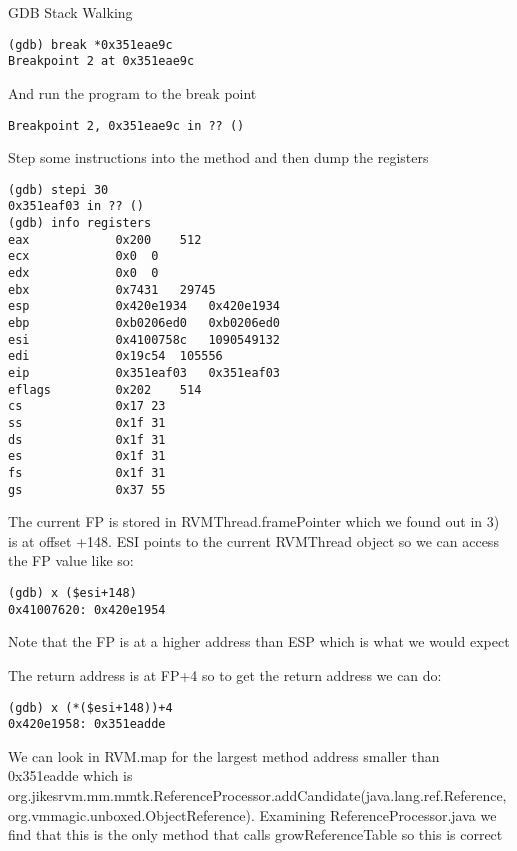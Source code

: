 \begin{section}{GDB Stack Walking}
\begin{lstlisting}[breaklines=true,breakatwhitespace=false]
(gdb) break *0x351eae9c
Breakpoint 2 at 0x351eae9c
\end{lstlisting}

And run the program to the break point

\begin{lstlisting}[breaklines=true,breakatwhitespace=false]
Breakpoint 2, 0x351eae9c in ?? ()
\end{lstlisting}

Step some instructions into the method and then dump the registers

\begin{lstlisting}[breaklines=true,breakatwhitespace=false]
(gdb) stepi 30
0x351eaf03 in ?? ()
(gdb) info registers
eax            0x200	512
ecx            0x0	0
edx            0x0	0
ebx            0x7431	29745
esp            0x420e1934	0x420e1934
ebp            0xb0206ed0	0xb0206ed0
esi            0x4100758c	1090549132
edi            0x19c54	105556
eip            0x351eaf03	0x351eaf03
eflags         0x202	514
cs             0x17	23
ss             0x1f	31
ds             0x1f	31
es             0x1f	31
fs             0x1f	31
gs             0x37	55
\end{lstlisting}

The current FP is stored in RVMThread.framePointer which we found out in 3) is at offset +148. ESI points to the current RVMThread object so we can access the FP value like so:

\begin{lstlisting}[breaklines=true,breakatwhitespace=false]
(gdb) x ($esi+148)
0x41007620:	0x420e1954
\end{lstlisting}

Note that the FP is at a higher address than ESP which is what we would expect

The return address is at FP+4 so to get the return address we can do:

\begin{lstlisting}[breaklines=true,breakatwhitespace=false]
(gdb) x (*($esi+148))+4
0x420e1958:	0x351eadde
\end{lstlisting}

We can look in RVM.map for the largest method address smaller than 0x351eadde which is org.jikes\-rvm.mm.mmtk.Reference\-Processor.add\-Can\-di\-da\-te(java.\-lang.\-ref.\-Re\-fe\-rence, org.vmmagic.unboxed.Object\-Reference). Examining ReferenceProcessor.java we find that this is the only method that calls growReferenceTable so this is correct


\end{section}
